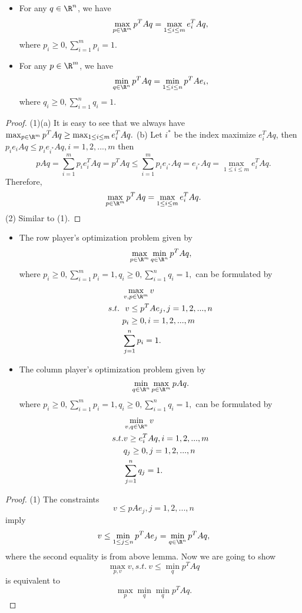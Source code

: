 \begin{refsection}
\begin{lemma}\hfill
	\begin{itemize}
		\item For any $q\in \R^n$, we have
		$$\max_{p\in \R^m} p^TAq = \max_{1\leq i\leq m} e_i^TAq,$$
		where $p_i \geq 0, \sum_{i=1}^m p_i = 1$.
		\item For any $p\in \R^m$, we have
		$$\min_{q\in \R^n} p^TAq = \min_{1\leq i\leq n} p^TAe_i,$$
		where $q_i \geq 0, \sum_{i=1}^n q_i = 1.$
	\end{itemize}	
\end{lemma}
\begin{proof}
	(1)(a) It is easy to see that we always have
	$\max_{p\in \R^m} p^TAq \geq \max_{1\leq i\leq m} e_i^TAq.$	
	(b) Let $i^*$ be the index maximize $e_i^TAq$, then
	$p_i e_iA q \leq p_ie_{i^*} A q, i=1,2,...,m$
	then
	$$pAq =\sum_{i=1}^m p_i e_i^TA q  = p^TAq \leq \sum_{i=1}^mp_ie_{i^*} A q = e_{i^*} A q = \max_{1\leq i\leq m} e_i^TAq.$$	
	Therefore, 
	$$\max_{p\in \R^m} p^TAq = \max_{1\leq i\leq m} e_i^TAq.$$
	(2) Similar to (1).
\end{proof}




\begin{theorem}\hfill
	\begin{itemize}
		\item The row player's optimization problem given by
		$$ \max_{p\in \R^m} \min_{q\in \R^n} p^TAq,$$
		where $p_i \geq 0, \sum_{i=1}^m p_i = 1,q_i \geq 0, \sum_{i=1}^n q_i = 1,$
		can be formulated by	
		\begin{align*}
		&\max_{v, p\in \R^m} v\\
		s.t.~ &~ v \leq p^T A e_j, j=1,2,...,n\\
		& p_i \geq 0, i=1,2,...,m\\
		& \sum_{j=1}^n p_i = 1 .
		\end{align*}
		\item The column player's optimization problem given by
		$$ \min_{q\in \R^n} \max_{p\in \R^m} pAq.$$
		where $p_i \geq 0, \sum_{i=1}^m p_i = 1,q_i \geq 0, \sum_{i=1}^n q_i = 1,$
		can be formulated by
		\begin{align*}
		&\min_{v, q\in \R^n} v\\
		s.t. & v \geq e_i^T A q, i=1,2,...,m\\
		& q_j \geq 0, j=1,2,...,n\\
		& \sum_{j=1}^n q_j = 1 .
		\end{align*}
	\end{itemize}	
\end{theorem}
\begin{proof}
(1) The constraints $$ v \leq p A e_j, j=1,2,...,n$$ imply $$v  \leq \min_{1\leq j\leq n} p^T A e_j = \min_{q\in \R^n} p^TAq,$$
where the second equality is from above lemma. 
Now we are going to show $$\max_{p,v} v, s.t. ~v \leq \min_q p^TAq$$ is equivalent to 
$$\max_p \min_q \min_q p^TAq. $$


\end{proof}
\end{refsection}
